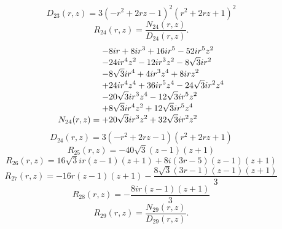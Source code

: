 \documentclass[11pt,a4paper]{article}
\begin{document}
\begin{equation}
D_{23}(r,z)=3 \left(- r^{2} + 2 r z - 1\right)^{2} \left(r^{2} + 2 r z + 1\right)^{2}
\label{eq:cat-denominator-23}
\end{equation}
\begin{equation}
R_{24}(r,z)=\frac{N_{24}(r,z)}{D_{24}(r,z)}.
\label{eq:cat-rational-24}
\end{equation}
\begin{equation}
N_{24}(r,z)=\shortstack[l]{$\displaystyle  - 8 i r + 8 i r^{3} + 16 i r^{5} - 52 i r^{5} z^{2}$\\
$\displaystyle  - 24 i r^{4} z^{2} - 12 i r^{3} z^{2} - 8 \sqrt{3} i r^{2}$\\
$\displaystyle  - 8 \sqrt{3} i r^{4} + 4 i r^{3} z^{4} + 8 i r z^{2}$\\
$\displaystyle  + 24 i r^{4} z^{4} + 36 i r^{5} z^{4} - 24 \sqrt{3} i r^{2} z^{4}$\\
$\displaystyle  - 20 \sqrt{3} i r^{3} z^{4} - 12 \sqrt{3} i r^{5} z^{2}$\\
$\displaystyle  + 8 \sqrt{3} i r^{4} z^{2} + 12 \sqrt{3} i r^{5} z^{4}$\\
$\displaystyle  + 20 \sqrt{3} i r^{3} z^{2} + 32 \sqrt{3} i r^{2} z^{2}$}
\label{eq:cat-numerator-24}
\end{equation}
\begin{equation}
D_{24}(r,z)=3 \left(- r^{2} + 2 r z - 1\right) \left(r^{2} + 2 r z + 1\right)
\label{eq:cat-denominator-24}
\end{equation}
\begin{equation}
R_{25}(r,z)=- 40 \sqrt{3} \left(z - 1\right) \left(z + 1\right)
\label{eq:cat-rational-25}
\end{equation}
\begin{equation}
R_{26}(r,z)=16 \sqrt{3} i r \left(z - 1\right) \left(z + 1\right) + 8 i \left(3 r - 5\right) \left(z - 1\right) \left(z + 1\right)
\label{eq:cat-rational-26}
\end{equation}
\begin{equation}
R_{27}(r,z)=- 16 r \left(z - 1\right) \left(z + 1\right) - \frac{8 \sqrt{3} \left(3 r - 1\right) \left(z - 1\right) \left(z + 1\right)}{3}
\label{eq:cat-rational-27}
\end{equation}
\begin{equation}
R_{28}(r,z)=- \frac{8 i r \left(z - 1\right) \left(z + 1\right)}{3}
\label{eq:cat-rational-28}
\end{equation}
\begin{equation}
R_{29}(r,z)=\frac{N_{29}(r,z)}{D_{29}(r,z)}.
\label{eq:cat-rational-29}
\end{equation}
\end{document}
